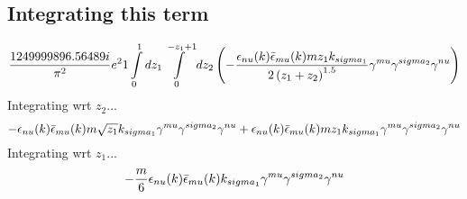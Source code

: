 \subsection*{Integrating this term}
\begin{dmath}\frac{1249999896.56489 i}{\pi^{2}} e^{2}1\int\limits_{ 0 }^{ 1 } d{ z_{ 1 } }\int\limits_{ 0 }^{ - { z_{ 1 } } + 1 } d{ z_{ 2 } }\left(- \frac{\epsilon_{ \\nu }({ k }) \bar{\epsilon}_{ \\mu }({ k }) m { z_{ 1 } } { { k }_{ \\sigma_1 } }}{2 \left({ z_{ 1 } } + { z_{ 2 } }\right)^{1.5}} { \gamma^{ \\mu } } { \gamma^{ \\sigma_2 } } { \gamma^{ \\nu } }\right)\end{dmath}
Integrating wrt ${ z_{ 2 } }$...
\begin{dmath}- \epsilon_{ \\nu }({ k }) \bar{\epsilon}_{ \\mu }({ k }) m \sqrt{{ z_{ 1 } }} { { k }_{ \\sigma_1 } } { \gamma^{ \\mu } } { \gamma^{ \\sigma_2 } } { \gamma^{ \\nu } } + \epsilon_{ \\nu }({ k }) \bar{\epsilon}_{ \\mu }({ k }) m { z_{ 1 } } { { k }_{ \\sigma_1 } } { \gamma^{ \\mu } } { \gamma^{ \\sigma_2 } } { \gamma^{ \\nu } }\end{dmath}
Integrating wrt ${ z_{ 1 } }$...
\begin{dmath}- \frac{m}{6} \epsilon_{ \\nu }({ k }) \bar{\epsilon}_{ \\mu }({ k }) { { k }_{ \\sigma_1 } } { \gamma^{ \\mu } } { \gamma^{ \\sigma_2 } } { \gamma^{ \\nu } }\end{dmath}
